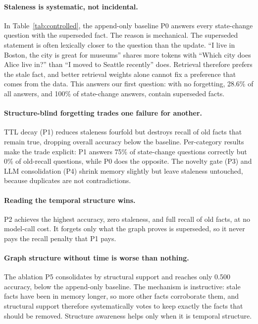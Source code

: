 \documentclass[letterpaper]{article} %
\begin{document}
\paragraph{Staleness is systematic, not incidental.} In Table~\ref{tab:controlled}, the append-only baseline P0 answers every state-change question with the superseded fact. The reason is mechanical. The superseded statement is often lexically closer to the question than the update. ``I live in Boston, the city is great for museums'' shares more tokens with ``Which city does Alice live in?'' than ``I moved to Seattle recently'' does. Retrieval therefore prefers the stale fact, and better retrieval weights alone cannot fix a preference that comes from the data. This answers our first question: with no forgetting, 28.6\% of all answers, and 100\% of state-change answers, contain superseded facts.

\paragraph{Structure-blind forgetting trades one failure for another.} TTL decay (P1) reduces staleness fourfold but destroys recall of old facts that remain true, dropping overall accuracy below the baseline. Per-category results make the trade explicit: P1 answers 75\% of state-change questions correctly but 0\% of old-recall questions, while P0 does the opposite. The novelty gate (P3) and LLM consolidation (P4) shrink memory slightly but leave staleness untouched, because duplicates are not contradictions.

\paragraph{Reading the temporal structure wins.} P2 achieves the highest accuracy, zero staleness, and full recall of old facts, at no model-call cost. It forgets only what the graph proves is superseded, so it never pays the recall penalty that P1 pays.

\paragraph{Graph structure without time is worse than nothing.} The ablation P5 consolidates by structural support and reaches only 0.500 accuracy, below the append-only baseline. The mechanism is instructive: stale facts have been in memory longer, so more other facts corroborate them, and structural support therefore systematically votes to keep exactly the facts that should be removed. Structure awareness helps only when it is temporal structure.
\end{document}
